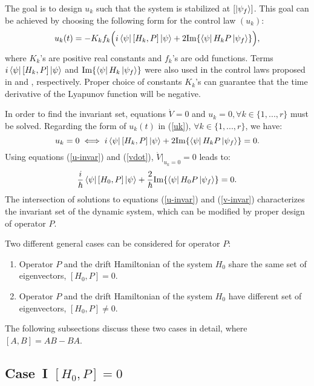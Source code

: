 \documentclass[journal]{IEEEtran}
\theoremstyle{definition}
\begin{document}
The goal is to design ${u_k}$ such that the system is stabilized at $[\ket{\psi_f}]$. This goal can be achieved by choosing the following form for the control law $(u_k)$:
\begin{equation}\label{uk}
    u_k(t)=-K_k f_k\Big(i\bra{\psi}[H_k,P]\ket{\psi}+2\text{Im}\{\bra{\psi}H_k P\ket{\psi_f}\}\Big),
\end{equation}
where $K_k$'s are positive real constants and $f_k$'s are odd functions. 
Terms $i\bra{\psi}[H_k,P]\ket{\psi}$ and $\text{Im}\{\bra{\psi}H_k\ket{\psi_f}\}$ were also used in the control laws proposed in \cite{grivopoulos2003lyapunov} and \cite{kuang2018lyapunov}, respectively. Proper choice of constants $K_k$'s can guarantee that the time derivative of the Lyapunov function will be negative.

In order to find the invariant set, equations $\dot{V}=0$ and $u_k=0,\forall{k}\in \{1,...,r\}$ must be solved. Regarding the form of $ u_k(t)$ in (\ref{uk}), $\forall{k}\in \{1,...,r\}$, we have:
\begin{equation}\label{u-invar}
    u_k=0 \iff i\bra{\psi}[H_k,P]\ket{\psi}+2\text{Im}\{\bra{\psi}H_k P\ket{\psi_f}\}=0.
\end{equation}
Using equations (\ref{u-invar}) and (\ref{vdot}), $\dot{V} |_{u_k=0}=0$ leads to:
\begin{equation}\label{v-invar}
\frac{i}{\hbar}\bra{\psi}[H_0,P]\ket{\psi}+\frac{2}{\hbar}\text{Im}\{\bra{\psi}H_0P\ket{\psi_f}\}=0.
\end{equation}
The intersection of solutions to equations (\ref{u-invar}) and (\ref{v-invar}) characterizes the invariant set of the dynamic system, which can be modified by proper design of operator $P$.

Two different general cases can be considered for operator $P$: 
\begin{enumerate}[label=(\roman*)]
  \item Operator $P$ and the drift Hamiltonian of the system $H_0$ share the same set of eigenvectors, $[H_0,P]=0$.
  \item Operator $P$ and the drift Hamiltonian of the system $H_0$ have different set of eigenvectors, $[H_0,P]\neq0$.
\end{enumerate}
The following subsections discuss these two cases in detail, where $[A,B]=AB-BA$.

\subsection{Case~I $[H_0,P]=0$}\label{case1}
\end{document}
